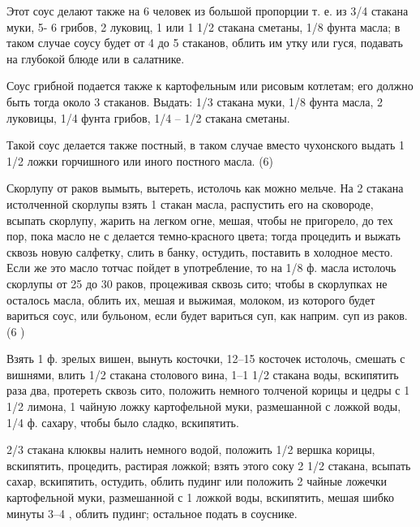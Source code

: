 Этот соус делают также на 6 человек из большой пропорции т. е. из 3/4 стакана муки, 5- 6 грибов, 2 луковиц, 1 или 1 1/2 стакана сметаны, 1/8 фунта масла; в таком случае соусу будет от 4 до 5 стаканов, облить им утку или гуся, подавать на глубокой блюде или в салатнике.

Соус грибной подается также к картофельным или рисовым котлетам; его должно быть тогда около 3 стаканов. Выдать: 1/3 стакана муки, 1/8 фунта масла, 2 луковицы, 1/4 фунта грибов, 1/4 – 1/2 стакана сметаны. 

Такой соус делается также постный, в таком случае вместо чухонского выдать 1 1/2 ложки горчишного или иного постного масла. (6) 


Скорлупу от раков вымыть, вытереть, истолочь как можно мельче. На 2 стакана истолченной скорлупы взять 1 стакан масла, распустить его на сковороде, всыпать скорлупу, жарить на легком огне, мешая, чтобы не пригорело, до тех пор, пока масло не с делается темно-красного цвета; тогда процедить и выжать сквозь новую салфетку, слить в банку, остудить, поставить в холодное место. Если же это масло тотчас пойдет в употребление, то на 1/8 ф. масла истолочь скорлупы от 25 до 30 раков, процеживая сквозь сито; чтобы в скорлупках не осталось масла, облить их, мешая и выжимая, молоком, из которого будет вариться соус, или бульоном, если будет вариться суп, как наприм. суп из раков. (6 ) 


Взять 1 ф. зрелых вишен, вынуть косточки, 12--15 косточек истолочь, смешать с вишнями, влить 1/2 стакана столового вина, 1--1 1/2 стакана воды, вскипятить раза два, протереть сквозь сито, положить немного толченой корицы и цедры с 1 1/2 лимона, 1 чайную ложку картофельной муки, размешанной с ложкой воды, 1/4 ф. сахару, чтобы было сладко, вскипятить. 


2/3 стакана клюквы налить немного водой, положить 1/2 вершка корицы, вскипятить, процедить, растирая ложкой; взять этого соку 2 1/2 стакана, всыпать сахар, вскипятить, остудить, облить пудинг или положить 2 чайные ложечки картофельной муки, размешанной с 1 ложкой воды, вскипятить, мешая шибко минуты 3--4 , облить пудинг; остальное подать в соуснике. 


